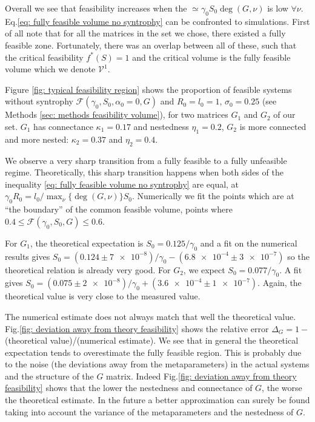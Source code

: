 \documentclass[12pt, titlepage]{report}
\begin{document}
Overall we see that feasibility increases when the  $\simeq \gamma_0 S_0 \deg(G,\nu) $ is low $\forall \nu$.
Eq.\eqref{eq: fully feasible volume no syntrophy} can be confronted to simulations. First of all note that for all the matrices in the set we chose, there existed a fully feasible zone. Fortunately, there was an overlap between all of these, such that the critical feasibility $f^*(S)=1$ and the critical volume is the fully feasible volume which we denote $\mathcal{V}^1$.

 Figure \ref{fig: typical feasibility region} shows the proportion of feasible systems without syntrophy $\mathcal{F}(\gamma_0, S_0, \alpha_0=0, G)$ and $R_0=l_0=1$, $\sigma_0=0.25$ (see Methods \ref{sec: methods feasibility volume}), for two matrices $G_1$ and $G_2$ of our set. $G_1$ has connectance $\kappa_1=0.17$ and nestedness $\eta_1=0.2$, $G_2$ is more connected and more nested: $\kappa_2=0.37$ and $\eta_2=0.4$.

We observe a very sharp transition from a fully feasible to a fully unfeasible regime. Theoretically, this sharp transition happens when both sides of the inequality \eqref{eq: fully feasible volume no syntrophy} are equal, \ie at $\gamma_0 R_0 = l_0/\max_\nu\{\deg(G,\nu)\}S_0$.
 Numerically we fit the points which are at ``the boundary'' of the common feasible volume, \ie points where $0.4 \leq \mathcal{F}(\gamma_0, S_0, G) \leq 0.6$.

 For $G_1$, the theoretical expectation is $S_0 = 0.125/ \gamma_0$ and a fit on the numerical results gives $S_0=(\num[scientific-notation=false]{0.124}\pm\num{7e-8})/ \gamma_0 - (\num{6.8e-4}\pm\num{3e-7})$ so the theoretical relation is already very good.
For $G_2$, we expect $S_0 = 0.077 /\gamma_0$. A fit gives $S_0=(\num[scientific-notation=false]{0.075}\pm\num{2e-8})/\gamma_0 +(\num{3.6e-4}\pm\num{1e-7})$. Again, the theoretical value is very close to the measured value.


The numerical estimate does not always match that well the theoretical value. Fig.\ref{fig: deviation away from theory feasibility} shows the relative error $\Delta_G = 1 -$ (theoretical value)/(numerical estimate). We see that in general the theoretical expectation tends to overestimate the fully feasible region. This is probably due to the noise (\ie the deviations away from the metaparameters) in the actual systems and the structure of the $G$ matrix. Indeed Fig.\ref{fig: deviation away from theory feasibility} shows that the lower the nestedness and connectance of $G$, the worse the theoretical estimate. In the future a better approximation can surely be found taking into account the variance of the metaparameters and the nestedness of $G$.
\end{document}
